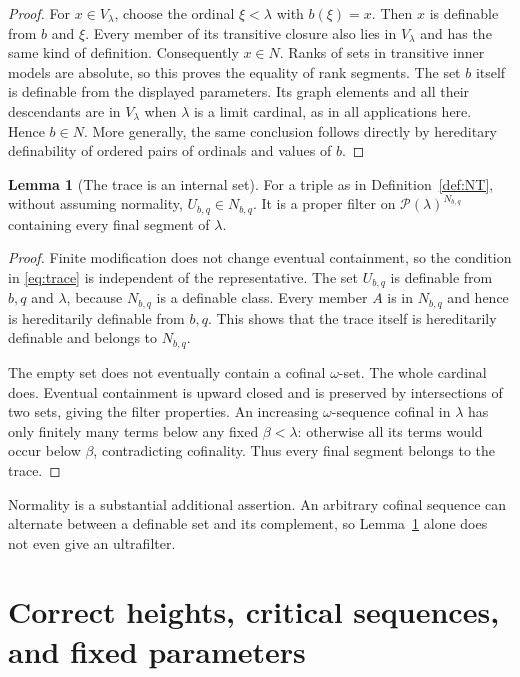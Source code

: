 \documentclass[11pt,letterpaper]{article}
\theoremstyle{definition}
\newtheorem{lemma}[definition]{Lemma}
\numberwithin{equation}{section}
\newcommand{\Pow}{\mathcal P}
\begin{document}
\begin{proof}
For $x\in V_\lambda$, choose the ordinal $\xi<\lambda$ with $b(\xi)=x$.
Then $x$ is definable from $b$ and $\xi$. Every member of its transitive
closure also lies in $V_\lambda$ and has the same kind of definition.
Consequently $x\in N$. Ranks of sets in transitive inner models are
absolute, so this proves the equality of rank segments. The set $b$
itself is definable from the displayed parameters. Its graph elements
and all their descendants are in $V_\lambda$ when $\lambda$ is a limit
cardinal, as in all applications here. Hence $b\in N$. More generally,
the same conclusion follows directly by hereditary definability of
ordered pairs of ordinals and values of $b$.
\end{proof}

\begin{lemma}[The trace is an internal set]\label{lem:trace-set}
For a triple as in Definition~\ref{def:NT}, without assuming normality,
$U_{b,q}\in N_{b,q}$. It is a proper filter on $\Pow(\lambda)^{N_{b,q}}$
containing every final segment of $\lambda$.
\end{lemma}

\begin{proof}
Finite modification does not change eventual containment, so the
condition in \eqref{eq:trace} is independent of the representative.
The set $U_{b,q}$ is definable from $b,q$ and $\lambda$, because
$N_{b,q}$ is a definable class. Every member $A$ is in $N_{b,q}$ and
hence is hereditarily definable from $b,q$. This shows that the trace
itself is hereditarily definable and belongs to $N_{b,q}$.

The empty set does not eventually contain a cofinal $\omega$-set. The
whole cardinal does. Eventual containment is upward closed and is
preserved by intersections of two sets, giving the filter properties.
An increasing $\omega$-sequence cofinal in $\lambda$ has only finitely
many terms below any fixed $\beta<\lambda$: otherwise all its terms
would occur below $\beta$, contradicting cofinality. Thus every final
segment belongs to the trace.
\end{proof}

Normality is a substantial additional assertion. An arbitrary cofinal
sequence can alternate between a definable set and its complement, so
Lemma~\ref{lem:trace-set} alone does not even give an ultrafilter.

\section{Correct heights, critical sequences, and fixed parameters}\label{sec:fixed}
\end{document}
